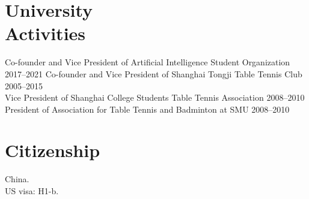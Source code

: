 \documentclass[margin, 10pt]{res} %
\begin{document}
\begin{resume}

\section{University\\Activities} 
Co-founder and Vice President of Artificial Intelligence Student Organization \hfill 2017--2021
Co-founder and Vice President of Shanghai Tongji Table Tennis Club \hfill 2005--2015\\
Vice President of Shanghai College Students Table Tennis Association \hfill 2008--2010\\
President of Association for Table Tennis and Badminton at SMU \hfill 2008--2010



\section{Citizenship} 
China. \\
US visa: H1-b.

\end{resume}
\end{document}
